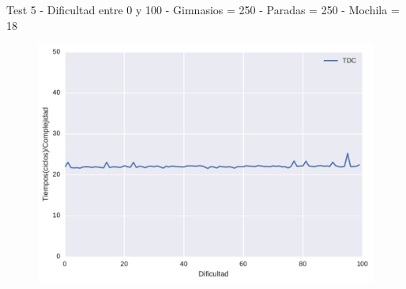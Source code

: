 Test 5 - 
Dificultad entre 0 y 100 - 
Gimnasios = 250 - 
Paradas = 250 - 
Mochila = 18

\begin{figure}[H]
  \begin{center}
    \includegraphics[scale=0.8]{imagenes/ej2test5iempos.pdf}
    \caption{}
    \label{}
  \end{center}
\end{figure}